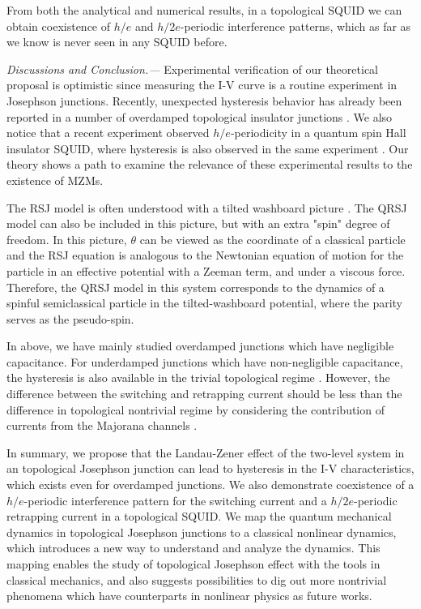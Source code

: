 \documentclass[aps,prl,twocolumn,showpacs,showpacs,10pt,superscriptaddress]{revtex4-1}
\begin{document}
From both the analytical and numerical results, in a topological SQUID we can obtain coexistence of $h/e$ and $h/2e$-periodic interference patterns, which as far as we know is never seen in any SQUID before.

{\it Discussions and Conclusion.---}
 Experimental verification of our theoretical proposal is optimistic since
measuring the I-V curve is a routine experiment in Josephson junctions. Recently, unexpected hysteresis behavior has already been reported in a number of overdamped topological insulator junctions \cite{molenkamp13,molenkamp16}. We also notice that a recent experiment observed $h/e$-periodicity in a quantum spin Hall insulator SQUID, where hysteresis is also observed in the same experiment \cite{kouwenhoven15}. Our theory shows a path to examine the relevance of these experimental results to the existence of MZMs.

The RSJ model is often understood with a tilted washboard picture \cite{tinkhambook}. The QRSJ model can also be included in this picture, but with an extra "spin" degree of freedom. In this picture, $\theta$ can be viewed as the coordinate of a classical particle and the RSJ equation is analogous to the Newtonian equation of motion for the particle in an effective potential with a Zeeman term, and under a viscous force. Therefore, the QRSJ model in this system corresponds to the dynamics of a spinful semiclassical particle in the tilted-washboard potential, where the parity serves as the pseudo-spin.

In above, we have mainly studied overdamped junctions which have negligible capacitance. For underdamped junctions which have non-negligible capacitance, the hysteresis is also available in the trivial topological regime \cite{tinkhambook}. However, the difference between the switching and retrapping current should be less than the difference in topological nontrivial regime by considering the contribution of currents from the Majorana channels \cite{supplement}.


In summary, we propose that the Landau-Zener effect of the two-level system in an topological Josephson junction can lead to hysteresis in the I-V characteristics, which exists even for overdamped junctions. We also demonstrate coexistence of a $h/e$-periodic interference pattern for the switching current and a $h/2e$-periodic retrapping current in a topological SQUID. We map the quantum mechanical dynamics in topological Josephson junctions to a classical nonlinear dynamics, which introduces a new way to understand and analyze the dynamics. This mapping enables the study of topological Josephson effect with the tools in classical mechanics, and also suggests possibilities to dig out more nontrivial phenomena which have counterparts in nonlinear physics as future works.
\end{document}
